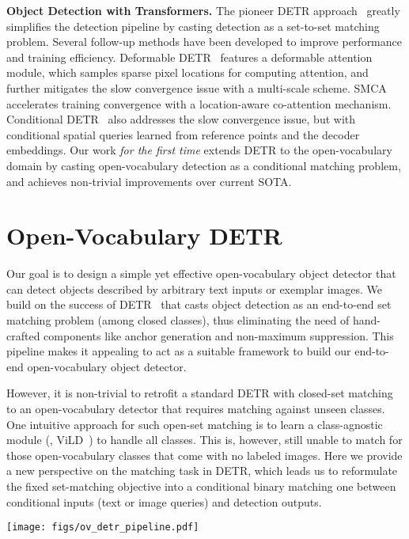 \documentclass[runningheads]{llncs}
\newcommand{\methodname}{OV-DETR\xspace}
\begin{document}
\noindent \textbf{Object Detection with Transformers.}
The pioneer DETR approach~\cite{carion2020end} greatly simplifies the detection pipeline by casting detection as a set-to-set matching problem. Several follow-up methods have been developed to improve performance and training efficiency. Deformable DETR~\cite{zhu2020deformable} features a deformable attention module, which samples sparse pixel locations for computing attention, and further mitigates the slow convergence issue with a multi-scale scheme. SMCA~\cite{gao2021fast} accelerates training convergence with a location-aware co-attention mechanism. Conditional DETR~\cite{meng2021conditional} also addresses the slow convergence issue, but with conditional spatial queries learned from reference points and the decoder embeddings. Our work \emph{for the first time} extends DETR to the open-vocabulary domain by casting open-vocabulary detection as a conditional matching problem, and achieves non-trivial improvements over current SOTA.


 \section{Open-Vocabulary DETR}

Our goal is to design a simple yet effective open-vocabulary object detector that can detect objects described by arbitrary text inputs or exemplar images. We build on the success of DETR~\cite{carion2020end} that casts object detection as an end-to-end set matching problem (among closed classes), thus eliminating the need of hand-crafted components like anchor generation and non-maximum suppression.
This pipeline makes it appealing to act as a suitable framework to build our end-to-end open-vocabulary object detector.

However, it is non-trivial to retrofit a standard DETR with closed-set matching to an open-vocabulary detector that requires matching against unseen classes. One intuitive approach for such open-set matching is to learn a class-agnostic module (\eg, ViLD~\cite{gu2021open}) to handle all classes. This is, however, still unable to match for those open-vocabulary classes that come with no labeled images. Here we provide a new perspective on the matching task in DETR, which leads us to reformulate the fixed set-matching objective into a conditional binary matching one between conditional inputs (text or image queries) and detection outputs.

\begin{figure*}[!t]
\centering
\texttt{[image: figs/ov\_detr\_pipeline.pdf]}
\caption{
\textbf{Overview of \methodname}. Unlike the standard DETR, our method does not separate `objects' from `non-objects' for a closed set of classes. Instead, \methodname performs open-vocabulary detection by measuring the matchability (`matched' vs. `not matched') between some conditional inputs (text or exemplar image embeddings from CLIP) and detection results. We show such pipeline is flexible to detect open-vocabulary classes with arbitrary text or image inputs. 
}
\label{fig:pipeline}
\end{figure*}
\end{document}

